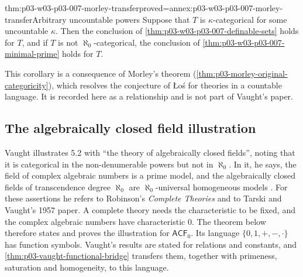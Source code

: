 \begin{hbcorollary}{thm:p03-w03-p03-007-morley-transfer}{proved=annex:p03-w03-p03-007-morley-transfer}{Arbitrary uncountable powers}
Suppose that \(T\) is \(\kappa\)-categorical for some uncountable \(\kappa\).
Then the conclusion of \cref{thm:p03-w03-p03-007-definable-sets} holds
for \(T\), and if \(T\) is not \(\aleph_0\)-categorical, the conclusion of
\cref{thm:p03-w03-p03-007-minimal-prime} holds for \(T\).
\end{hbcorollary}

This corollary is a consequence of Morley's theorem
(\cref{thm:p03-morley-original-categoricity}), which resolves the conjecture
of Łoś for theories in a countable language. It is recorded here as a
relationship and is not part of Vaught's paper.

\subsection{The algebraically closed field illustration}
\label{sec:p03-w03-p03-007-acf}

Vaught illustrates 5.2 with ``the theory of algebraically closed fields'',
noting that it is categorical in the non-denumerable powers but not in
\(\aleph_0\). In it, he says, the field of complex algebraic numbers is a
prime model, and the algebraically closed fields of transcendence degree
\(\aleph_0\) are \(\aleph_0\)-universal homogeneous models
\cite[p.~316]{Vaught1961}. For these assertions he refers to Robinson's
\emph{Complete Theories} and to Tarski and Vaught's 1957 paper. A complete
theory needs the characteristic to be fixed, and the complex algebraic
numbers have characteristic \(0\). The theorem below therefore states and
proves the illustration for \(\mathsf{ACF}_0\). Its language
\(\{0,1,+,-,\cdot\}\) has function symbols. Vaught's results are stated for
relations and constants, and \cref{thm:p03-vaught-functional-bridge}
transfers them, together with primeness, saturation and homogeneity, to this
language.

